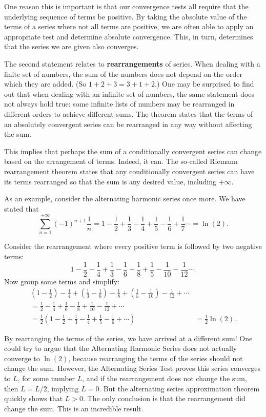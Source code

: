 One reason this is important is that our convergence tests all require that the underlying sequence of terms be positive. By taking the absolute value of the terms of a series where not all terms are positive, we are often able to apply an appropriate test and determine absolute convergence. This, in turn, determines that the series we are given also converges.

The second statement relates to \textbf{rearrangements} of series. When dealing with a finite set of numbers, the sum of the numbers does not depend on the order which they are added. (So $1+2+3 = 3+1+2$.) One may be surprised to find out that when dealing with an infinite set of numbers, the same statement does not always hold true: some infinite lists of numbers may be rearranged in different orders to achieve different sums. The theorem states that the terms of an absolutely convergent series can be rearranged in any way without affecting the sum.

This implies that perhaps the sum of a conditionally convergent series can change based on the arrangement of terms. Indeed, it can. The so-called Riemann rearrangement theorem  states that any conditionally convergent series can have its terms rearranged so that the sum is any desired value, including $+\infty$.

As an example, consider the alternating harmonic series once more. We have stated that 
$$\sum_{n=1}^{+\infty} (-1)^{n+1}\frac1n = 1-\frac12+\frac13-\frac14+\frac15-\frac16+\frac17\cdots = \ln (2).$$

Consider the rearrangement where every positive term is followed by two negative terms:
$$
1-\frac12-\frac14+\frac13-\frac16-\frac18+\frac15-\frac1{10}-\frac1{12}\cdots .
$$
Now group some terms and simplify:
\begin{align*}
\left(1-\frac12\right)-\frac14+\left(\frac13-\frac16\right)-\frac18+\left(\frac15-\frac1{10}\right)-\frac1{12}+\cdots & \\
=\frac12-\frac14+\frac16-\frac18+\frac1{10}-\frac{1}{12}+\cdots & \\
=\frac12\left(1-\frac12+\frac13-\frac14+\frac15-\frac16+\cdots\right) & = \frac12\ln (2).
\end{align*}

By rearranging the terms of the series, we have arrived at a different sum! \ifanalysis One could try to argue that the Alternating Harmonic Series does not actually converge to $\ln (2)$, because rearranging the terms of the series should not change the sum. However, the Alternating Series Test proves this series converges to $L$, for some number $L$, and if the rearrangement does not change the sum, then $L = L/2$, implying $L=0$. But the alternating series approximation theorem quickly shows that $L>0$. The only conclusion is that the rearrangement did change the sum. \fi This is an incredible result.

